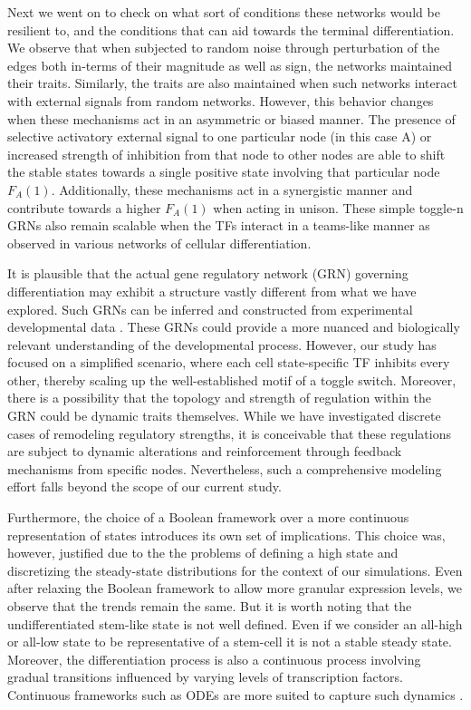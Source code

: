 \documentclass[11pt,a4paper]{article}
\theoremstyle{definition}
\theoremstyle{remark}
\begin{document}
Next we went on to check on what sort of conditions these networks would be resilient to, and the conditions that can aid towards the terminal differentiation. We observe that when subjected to random noise through perturbation of the edges both in-terms of their magnitude as well as sign, the networks maintained their traits. Similarly, the traits are also maintained when such networks interact with external signals from random networks. However, this behavior changes when these mechanisms act in an asymmetric or biased manner. The presence of selective activatory external signal to one particular node (in this case A) or increased strength of inhibition from that node to other nodes are able to shift the stable states towards a single positive state involving that particular node $F_A(1)$. Additionally, these mechanisms act in a synergistic manner and contribute towards a higher $F_A(1)$ when acting in unison. These simple toggle-n GRNs also remain scalable when the TFs interact in a teams-like manner as observed in various networks of cellular differentiation.

It is plausible that the actual gene regulatory network (GRN) governing differentiation may exhibit a structure vastly different from what we have explored. Such GRNs can be inferred and constructed from experimental developmental data \parencite{okawa_differential_2015, okawa_generalized_2016, kim_canalizing_2024}. These GRNs could provide a more nuanced and biologically relevant understanding of the developmental process. However, our study has focused on a simplified scenario, where each cell state-specific TF inhibits every other, thereby scaling up the well-established motif of a toggle switch. Moreover, there is a possibility that the topology and strength of regulation within the GRN could be dynamic traits themselves. While we have investigated discrete cases of remodeling regulatory strengths, it is conceivable that these regulations are subject to dynamic alterations and reinforcement through feedback mechanisms from specific nodes. Nevertheless, such a comprehensive modeling effort falls beyond the scope of our current study.

Furthermore, the choice of a Boolean framework over a more continuous representation of states introduces its own set of implications. This choice was, however, justified due to the the problems of defining a high state and discretizing the steady-state distributions for the context of our simulations. Even after relaxing the Boolean framework to allow more granular expression levels, we observe that the trends remain the same. But it is worth noting that the undifferentiated stem-like state is not well defined. Even if we consider an all-high or all-low state to be representative of a stem-cell it is not a stable steady state. Moreover, the differentiation process is also a continuous process involving gradual transitions influenced by varying levels of transcription factors. Continuous frameworks such as ODEs are more suited to capture such dynamics \parencite{lu_combinatorial_2025}.
\end{document}
